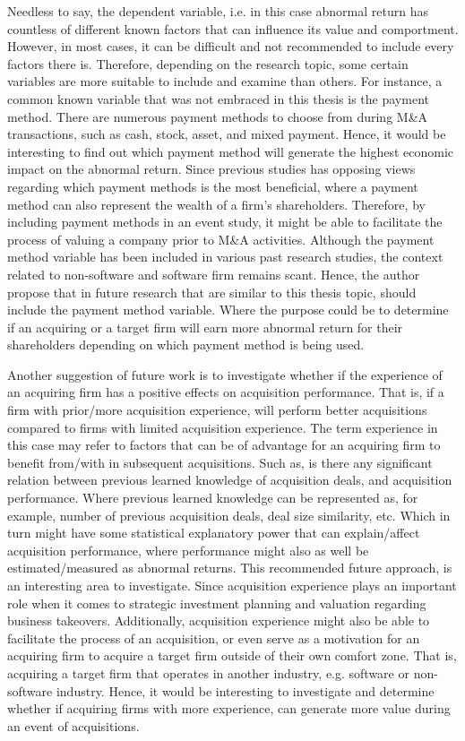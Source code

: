 \documentclass[preprint,10pt]{elsarticle}
\begin{document}
Needless to say, the dependent variable, i.e. in this case abnormal return has countless of different known factors that can influence its value and comportment. However, in most cases, it can be difficult and not recommended to include every factors there is. Therefore, depending on the research topic, some certain variables are more suitable to include and examine than others. For instance, a common known variable that was not embraced in this thesis is the payment method. There are numerous payment methods to choose from during M\&A transactions, such as cash, stock, asset, and mixed payment. Hence, it would be interesting to find out which payment method will generate the highest economic impact on the abnormal return. Since previous studies has opposing views regarding which payment methods is the most beneficial, where a payment method can also represent the wealth of a firm's shareholders. Therefore, by including payment methods in an event study, it might be able to facilitate the process of valuing a company prior to M\&A activities. Although the payment method variable has been included in various past research studies, the context related to non-software and software firm remains scant. Hence, the author propose that in future research that are similar to this thesis topic, should include the payment method variable. Where the purpose could be to determine if an acquiring or a target firm will earn more abnormal return for their shareholders depending on which payment method is being used.

Another suggestion of future work is to investigate whether if the experience of an acquiring firm has a positive effects on acquisition performance. That is, if a firm with prior/more acquisition experience, will perform better acquisitions compared to firms with limited acquisition experience. The term experience in this case may refer to factors that can be of advantage for an acquiring firm to benefit from/with in subsequent acquisitions. Such as, is there any significant relation between previous learned knowledge of acquisition deals, and acquisition performance. Where previous learned knowledge can be represented as, for example, number of previous acquisition deals, deal size similarity, etc. Which in turn might have some statistical explanatory power that can explain/affect acquisition performance, where performance might also as well be estimated/measured as abnormal returns. This recommended future approach, is an interesting area to investigate. Since acquisition experience plays an important role when it comes to strategic investment planning and valuation regarding business takeovers. Additionally, acquisition experience might also be able to facilitate the process of an acquisition, or even serve as a motivation for an acquiring firm to acquire a target firm outside of their own comfort zone. That is, acquiring a target firm that operates in another industry, e.g. software or non-software industry. Hence, it would be interesting to investigate and determine whether if acquiring firms with more experience, can generate more value during an event of acquisitions.
\end{document}
